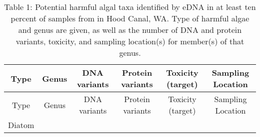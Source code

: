 \documentclass[
]{article}
\begin{document}
\smallsize

\begin{longtable}[]{@{}cccccc@{}}
\caption{Table 1: Potential harmful algal taxa identified by eDNA in at
least ten percent of samples from in Hood Canal, WA. Type of harmful
algae and genus are given, as well as the number of DNA and protein
variants, toxicity, and sampling location(s) for member(s) of that
genus. \normalsize }\tabularnewline
\toprule
\begin{minipage}[b]{0.11\columnwidth}\centering
Type\strut
\end{minipage} & \begin{minipage}[b]{0.13\columnwidth}\centering
Genus\strut
\end{minipage} & \begin{minipage}[b]{0.10\columnwidth}\centering
DNA variants\strut
\end{minipage} & \begin{minipage}[b]{0.13\columnwidth}\centering
Protein variants\strut
\end{minipage} & \begin{minipage}[b]{0.20\columnwidth}\centering
Toxicity (target)\strut
\end{minipage} & \begin{minipage}[b]{0.16\columnwidth}\centering
Sampling Location\strut
\end{minipage}\tabularnewline
\midrule
\endfirsthead
\toprule
\begin{minipage}[b]{0.11\columnwidth}\centering
Type\strut
\end{minipage} & \begin{minipage}[b]{0.13\columnwidth}\centering
Genus\strut
\end{minipage} & \begin{minipage}[b]{0.10\columnwidth}\centering
DNA variants\strut
\end{minipage} & \begin{minipage}[b]{0.13\columnwidth}\centering
Protein variants\strut
\end{minipage} & \begin{minipage}[b]{0.20\columnwidth}\centering
Toxicity (target)\strut
\end{minipage} & \begin{minipage}[b]{0.16\columnwidth}\centering
Sampling Location\strut
\end{minipage}\tabularnewline
\midrule
\endhead
\begin{minipage}[t]{0.11\columnwidth}\centering
Diatom\strut
\end{minipage} & \begin{minipage}[t]{0.13\columnwidth}\centering

\end{minipage}
\end{longtable}
\end{document}
